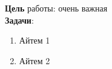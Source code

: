 \textbf{Цель} работы: очень важная\\

\textbf{Задачи}:
\begin{enumerate}
  \item Айтем 1
  \item Айтем 2
\end{enumerate}